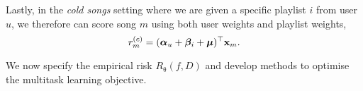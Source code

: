 Lastly, %
in the \emph{cold songs} setting where we are given a specific playlist $i$ from user $u$,
we therefore can score song $m$ using both user weights and playlist weights, \ie
\vspace{-.3em}
\begin{equation}
\label{eq:cs}
r_m^{(c)} = ({\bm{\alpha}}_u + {\bm{\beta}}_i + \bm{\mu})^\top \mathbf{x}_m.
\end{equation}




We now specify the empirical risk $R_{\uptheta}(f, D)$ %
and develop methods to optimise the multitask learning objective.




